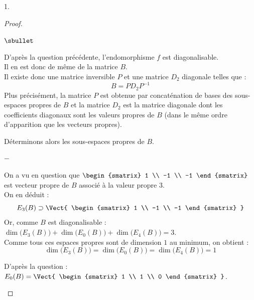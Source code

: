 \documentclass[11pt]{article}%
\begin{document}
\begin{noliste}{1.}
  \begin{proof}~%
    \begin{noliste}{$\sbullet$}
    \item D'après la question précédente, l'endomorphisme $f$ est
      diagonalisable.\\
      Il en est donc de même de la matrice $B$.\\
      Il existe donc une matrice inversible $P$ et une matrice $D_2$
      diagonale telles que :
      \[
      B = P D_2 P^{-1}
      \]
      Plus précisément, la matrice $P$ est obtenue par concaténation
      de bases des sous-espaces propres de $B$ et la matrice $D_2$ est
      la matrice diagonale dont les coefficients diagonaux sont les
      valeurs propres de $B$ (dans le même ordre d'apparition que les
      vecteurs propres).
    \item Déterminons alors les sous-espaces propres de $B$.
      \begin{noliste}{$-$}
      \item On a vu en question  que $
        \begin{smatrix}
          1 \\
          -1 \\
          -1
        \end{smatrix}
        $ est vecteur propre de $B$ associé à la valeur propre $3$.\\
        On en déduit :
        \[
        E_3(B) \supset \Vect{
          \begin{smatrix}
            1 \\
            -1 \\
            -1            
          \end{smatrix}
        }
        \]
        Or, comme $B$ est diagonalisable : $\dim\big( E_3(B) \big) +
        \dim\big( E_0(B) \big) + \dim\big( E_4(B) \big) = 3$.\\
        Comme tous ces espaces propres sont de dimension $1$ au
        minimum, on obtient : 
        \[
        \dim\big( E_3(B) \big) = \dim\big( E_0(B) \big) = \dim\big(
        E_4(B) \big) = 1
        \]

      \item D'après la question  : $E_0(B) = \Vect{
          \begin{smatrix}
            1 \\
            1 \\
            0
          \end{smatrix}
        }$.
        

\end{noliste}
\end{noliste}
\end{proof}
\end{noliste}
\end{document}
